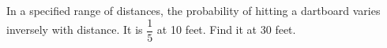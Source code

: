 In a specified range of distances, the probability of hitting a dartboard varies inversely with distance. It is $\dfrac{1}{5}$ at 10 feet. Find it at 30 feet.

